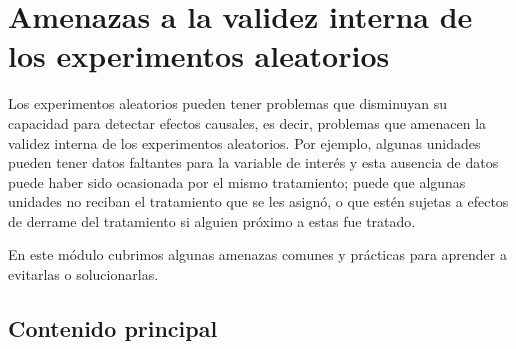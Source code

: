 \documentclass[12pt,spanish,]{book}
\begin{document}
\hypertarget{amenazas-a-la-validez-interna-de-los-experimentos-aleatorios}{%
\chapter{Amenazas a la validez interna de los experimentos aleatorios}\label{amenazas-a-la-validez-interna-de-los-experimentos-aleatorios}}

Los experimentos aleatorios pueden tener problemas que disminuyan su capacidad para detectar efectos causales, es decir, problemas que amenacen la validez interna de los experimentos aleatorios. Por ejemplo, algunas unidades pueden tener datos faltantes para la variable de interés y esta ausencia de datos puede haber sido ocasionada por el mismo tratamiento; puede que algunas unidades no reciban el tratamiento que se les asignó, o que estén sujetas a efectos de derrame del tratamiento si alguien próximo a estas fue tratado.

En este módulo cubrimos algunas amenazas comunes y prácticas para aprender a evitarlas o solucionarlas.

\hypertarget{contenido-principal-7}{%
\section{Contenido principal}\label{contenido-principal-7}}
\end{document}
